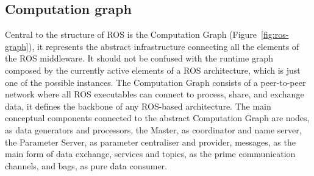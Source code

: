 \subsection{Computation graph}
Central to the structure of ROS is the Computation Graph (Figure~\ref{fig:ros-graph}), it represents the abstract infrastructure connecting all the elements of the ROS middleware. It should not be confused with the runtime graph composed by the currently active elements of a ROS architecture, which is just one of the possible instances.  The Computation Graph consists of a peer-to-peer network where all ROS executables can connect to process, share, and exchange data, it defines the backbone of any ROS-based architecture. The main conceptual components connected to the abstract Computation Graph are nodes, as data generators and processors, the Master, as coordinator and name server, the Parameter Server, as parameter centraliser and provider, messages, as the main form of data exchange, services and topics, as the prime communication channels, and bags, as pure data consumer.

